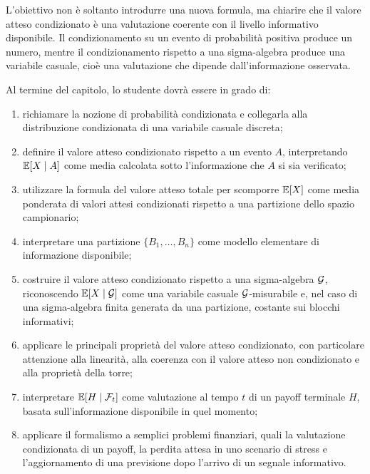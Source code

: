 L'obiettivo non \`{e} soltanto introdurre una nuova formula, ma chiarire che il valore atteso condizionato \`{e} una valutazione coerente con il livello informativo disponibile. Il condizionamento su un evento di probabilit\`{a} positiva produce un numero, mentre il condizionamento rispetto a una sigma-algebra produce una variabile casuale, cio\`{e} una valutazione che dipende dall'informazione osservata.

Al termine del capitolo, lo studente dovr\`{a} essere in grado di:

\begin{enumerate}
    \item richiamare la nozione di probabilit\`{a} condizionata e collegarla alla distribuzione condizionata di una variabile casuale discreta;

    \item definire il valore atteso condizionato rispetto a un evento $A$, interpretando $ \mathbb{E}[X\mid A] $ come media calcolata sotto l'informazione che $A$ si sia verificato;

    \item utilizzare la formula del valore atteso totale per scomporre $ \mathbb{E}[X] $ come media ponderata di valori attesi condizionati rispetto a una partizione dello spazio campionario;

    \item interpretare una partizione $ \{B_1,\ldots,B_n\} $ come modello elementare di informazione disponibile;


    \item costruire il valore atteso condizionato rispetto a una sigma-algebra $ \mathcal{G} $, riconoscendo $ \mathbb{E}[X\mid\mathcal{G}] $ come una variabile casuale $ \mathcal{G} $-misurabile e, nel caso di una sigma-algebra finita generata da una partizione, costante sui blocchi informativi;



    \item applicare le principali propriet\`{a} del valore atteso condizionato, con particolare attenzione alla linearit\`{a}, alla coerenza con il valore atteso non condizionato e alla propriet\`{a} della torre;

    \item interpretare $ \mathbb{E}[H\mid\mathcal{F}_t] $ come valutazione al tempo $t$ di un payoff terminale $H$, basata sull'informazione disponibile in quel momento;

    \item applicare il formalismo a semplici problemi finanziari, quali la valutazione condizionata di un payoff, la perdita attesa in uno scenario di stress e l'aggiornamento di una previsione dopo l'arrivo di un segnale informativo.
\end{enumerate}

